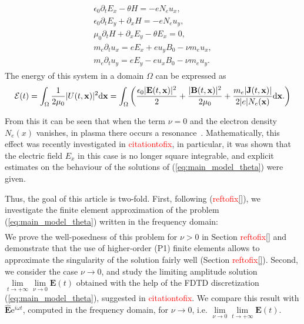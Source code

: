 \begin{align}
\label{eq:main_model_theta}
\begin{split}
\epsilon_0\partial_t E_{x}-\theta H=-eN_e u_x,\nonumber\\
\epsilon_0\partial_t E_{y}+\partial_x H=-eN_e u_y,\nonumber\\
\mu_0\partial_t H+\partial_x E_y-\theta E_x=0,\\
m_e\partial_t u_x=eE_x+eu_yB_0-\nu m_e u_x,\nonumber\\
m_e\partial_t u_y=eE_y-eu_xB_0-\nu m_e u_y.
\end{split}
\end{align}
The energy of this system in a domain $\Omega$ can be expressed as \cite{stable_yee_plasma_current}
\begin{align*}
{\mathcal E}(t)= \int_\Omega \frac{1}{2\mu_0}|U(t,{\bf x})|^2\mathrm{d}{\bf x} =\int_\Omega \left(
\frac{\epsilon_0 |{\bf E}(t,{\bf x})|^2}{2}+\frac{ |{\bf B}(t,{\bf x})|^2}{2\mu_0}+\frac{m_e|{\bf J} (t,{\bf x})|}{2|e|N_e({\bf x})} \mathrm{d}{\bf x}.
\right)
\end{align*}

From this it can be seen that when the term $\nu=0$ and the electron density $N_e(x)$ vanishes, 
in plasma there occurs a resonance~\cite{Stix}. Mathematically, this effect was recently investigated in \textcolor{red}{citationtofix}\cite{}, 
in particular, it was shown that the electric field $E_x$ in this case is no longer square 
integrable, and explicit estimates on the behaviour of the solutions of (\ref{eq:main_model_theta}) were given. 

Thus, the goal of this article is two-fold. 
First, following (\textcolor{red}{reftofix}\ref{}), we investigate the finite element approximation of the 
problem (\ref{eq:main_model_theta}) written in the frequency domain:
\begin{align*}
\end{align*}
We prove the well-posedness of this problem for $\nu>0$ in Section \textcolor{red}{reftofix}\ref{} and 
demonstrate that the use of higher-order (P1) finite elements allows to approximate the singularity of the solution fairly well (Section \textcolor{red}{reftofix}\ref{}). 
Second, we consider the case $\nu\rightarrow 0$, and study the limiting amplitude solution 
$\lim\limits_{t\rightarrow +\infty}\lim\limits_{\nu\rightarrow 0}\mathbf{E}(t)$ obtained with the help of 
the FDTD discretization (\ref{eq:main_model_theta}), suggested in \textcolor{red}{citationtofix}\cite{}. We compare this result with 
$\hat{\mathbf{E}}\mathrm{e}^{i\omega t}$, computed in the frequency domain, for $\nu\rightarrow 0$, i.e.
$\lim\limits_{\nu\rightarrow 0}\lim\limits_{t\rightarrow+\infty}\mathbf{E}(t)$.

